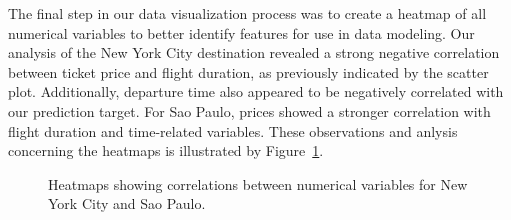 The final step in our data visualization process was to create a heatmap of all numerical variables to better identify features for use in data modeling.
Our analysis of the New York City destination revealed a strong negative correlation between ticket price and flight duration, as previously indicated by the scatter plot.
Additionally, departure time also appeared to be negatively correlated with our prediction target.
For Sao Paulo, prices showed a stronger correlation with flight duration and time-related variables.
These observations and anlysis concerning the heatmaps is illustrated by Figure~\ref{fig:heat}.
\begin{figure}
    \centering
    \caption{Heatmaps showing correlations between numerical variables for New York City and Sao Paulo.}
    \label{fig:heat}
\end{figure}




